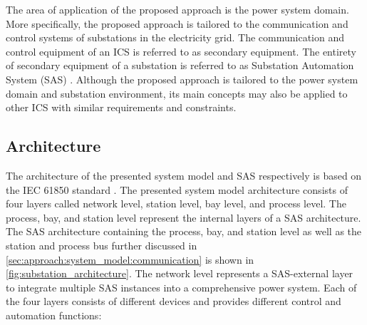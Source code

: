 The area of application of the proposed approach is the power system domain.
More specifically, the proposed approach is tailored to the communication and control systems of substations in the electricity grid.
The communication and control equipment of an ICS is referred to as secondary equipment.
The entirety of secondary equipment of a substation is referred to as Substation Automation System (SAS) \cite{Padilla2015}.
Although the proposed approach is tailored to the power system domain and substation environment, its main concepts may also be applied to other ICS with similar requirements and constraints.

\subsection{Architecture}
The architecture of the presented system model and SAS respectively is based on the IEC 61850 standard \cite{IEC61850P5}.
The presented system model architecture consists of four layers called network level, station level, bay level, and process level.
The process, bay, and station level represent the internal layers of a SAS architecture.
The SAS architecture containing the process, bay, and station level as well as the station and process bus further discussed in \autoref{sec:approach:system_model:communication} is shown in \autoref{fig:substation_architecture}.
The network level represents a SAS-external layer to integrate multiple SAS instances into a comprehensive power system.
Each of the four layers consists of different devices and provides different control and automation functions:
